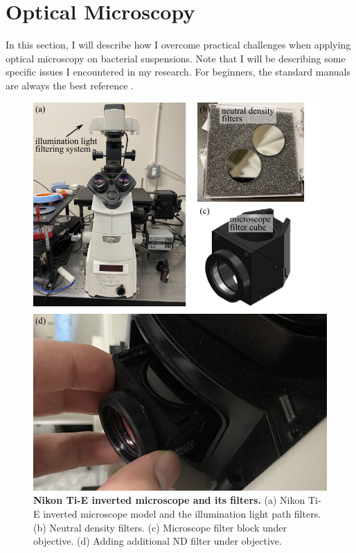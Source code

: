 \section{Optical Microscopy}
\label{sec:optical-microscopy}

In this section, I will describe how I overcome practical challenges when applying optical microscopy on bacterial suspensions. Note that I will be describing some specific issues I encountered in my research. For beginners, the standard manuals are always the best reference \cite{NikonTiEManual}.

\begin{figure}[hp]
	\begin{center}
	\includegraphics[width=4.5 in]{Figs/2-Exp/3.pdf}
	\end{center}
	\caption[Nikon Ti-E Inverted Microscope and Its Filters]
	{
	\textbf{Nikon Ti-E inverted microscope and its filters.}
	(a) Nikon Ti-E inverted microscope model and the illumination light path filters.
	(b) Neutral density filters.
	(c) Microscope filter block under objective.
	(d) Adding additional ND filter under objective.
	}
	\label{fig:microscope-and-filters}
\end{figure}

